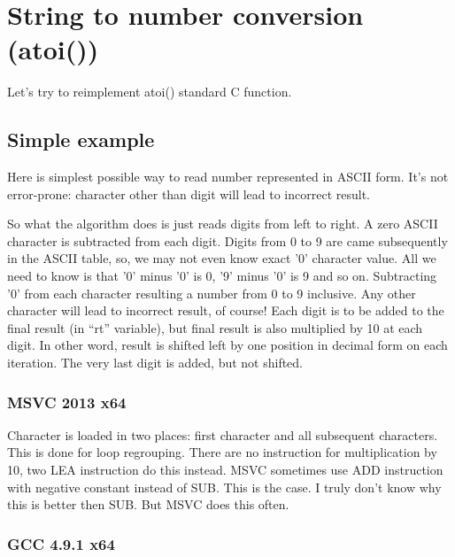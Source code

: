\ifdefined\RUSSIAN
\else

\chapter{String to number conversion (atoi())}

Let's try to reimplement atoi() standard C function.

\section{Simple example}

Here is simplest possible way to read number represented in \ac{ASCII} form.
It's not error-prone: character other than digit will lead to incorrect result.



So what the algorithm does is just reads digits from left to right. 
A zero \ac{ASCII} character is subtracted from each digit. 
Digits from 0 to 9 are came subsequently in the \ac{ASCII} table, so, 
we may not even know exact '0' character value. 
All we need to know is that '0' minus '0' is 0, '9' minus '0' is 9 and so on.
Subtracting '0' from each character resulting a number from 0 to 9 inclusive.
Any other character will lead to incorrect result, of course!
Each digit is to be added to the final result (in ``rt'' variable), but final result
is also multiplied by 10 at each digit.
In other word, result is shifted left by one position in decimal form on each iteration.
The very last digit is added, but not shifted.

\subsection{\Optimizing MSVC 2013 x64}



Character is loaded in two places: first character and all subsequent characters.
This is done for loop regrouping.
There are no instruction for multiplication by 10, two LEA instruction do this instead.
MSVC sometimes use ADD instruction with negative constant instead of SUB.
This is the case.
I truly don't know why this is better then SUB.
But MSVC does this often.

\subsection{\Optimizing GCC 4.9.1 x64}

